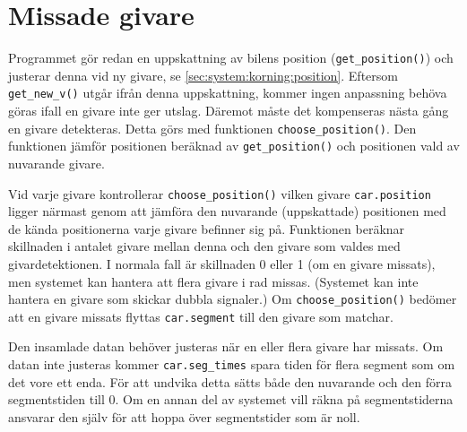 \section{Missade givare}
\label{sec:missade givare}

Programmet gör redan en uppskattning av bilens position (\texttt{get\_position()})
 och justerar denna vid ny givare, se \ref{sec:system:korning:position}.
Eftersom \texttt{get\_new\_v()} utgår ifrån denna uppskattning, kommer ingen
anpassning behöva göras ifall en givare inte ger utslag. Däremot måste det 
kompenseras nästa gång en givare detekteras. Detta görs med funktionen
\texttt{choose\_position()}. Den funktionen jämför positionen beräknad av 
\texttt{get\_position()} och positionen vald av nuvarande givare. 

Vid varje givare kontrollerar \texttt{choose\_position()} vilken givare
\texttt{car.position} ligger närmast genom att jämföra den nuvarande
(uppskattade) positionen med de kända positionerna varje givare befinner sig på.
Funktionen beräknar skillnaden i antalet givare mellan denna och den givare som
valdes med givardetektionen. I normala fall är skillnaden 0 eller 1 (om en
givare missats), men systemet kan hantera att flera givare i rad missas.
(Systemet kan inte hantera en givare som skickar dubbla signaler.) Om
\texttt{choose\_position()} bedömer att en givare missats flyttas
\texttt{car.segment} till den givare som matchar.

Den insamlade datan behöver justeras när en eller flera givare har missats. Om
datan inte justeras kommer \texttt{car.seg\_times} spara tiden för flera segment
som om det vore ett enda. För att undvika detta sätts både den nuvarande och den
förra segmentstiden till 0. Om en annan del av systemet vill räkna på
segmentstiderna ansvarar den själv för att hoppa över segmentstider som är noll.
